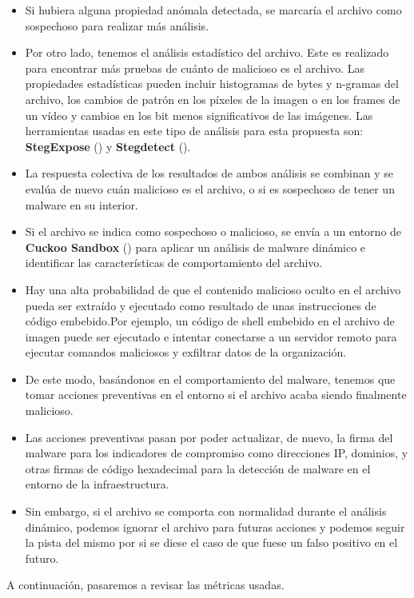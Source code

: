\begin{itemize}
\item Si hubiera alguna propiedad anómala detectada, se marcaría el archivo como sospechoso para realizar más análisis.
\item Por otro lado, tenemos el análisis estadístico del archivo. Este es realizado para encontrar más pruebas de cuánto de malicioso es el archivo. Las propiedades estadísticas pueden incluir histogramas de bytes y n-gramas del archivo, los cambios de patrón en los píxeles de la imagen o en los frames de un vídeo y cambios en los bit menos significativos de las imágenes. Las herramientas usadas en este tipo de análisis para esta propuesta son: \textbf{StegExpose} (\cite{stegexpose}) y \textbf{Stegdetect} (\cite{stegdetect}). %
\item La respuesta colectiva de los resultados de ambos análisis se combinan y se evalúa de nuevo cuán malicioso es el archivo, o si es sospechoso de tener un malware en su interior.
\item Si el archivo se indica como sospechoso o malicioso, se envía a un entorno de \textbf{Cuckoo Sandbox} (\cite{cuckoo-sandbox}) para aplicar un análisis de malware dinámico e identificar las características de comportamiento del archivo.%
\item Hay una alta probabilidad de que el contenido malicioso oculto en el archivo pueda ser extraído y ejecutado como resultado de unas instrucciones de código embebido.Por ejemplo, un código de shell embebido en el archivo de imagen puede ser ejecutado e intentar conectarse a un servidor remoto para ejecutar comandos maliciosos y exfiltrar datos de la organización.
\item De este modo, basándonos en el comportamiento del malware, tenemos que tomar acciones preventivas en el entorno si el archivo acaba siendo finalmente malicioso.
\item Las acciones preventivas pasan por poder actualizar, de nuevo, la firma del malware para los indicadores de compromiso como direcciones IP, dominios, y otras firmas de código hexadecimal para la detección de malware en el entorno de la infraestructura.
\item Sin embargo, si el archivo se comporta con normalidad durante el análisis dinámico, podemos ignorar el archivo para futuras acciones y podemos seguir la pista del mismo por si se diese el caso de que fuese un falso positivo en el futuro.
\end{itemize}

A continuación, pasaremos a revisar las métricas usadas.

